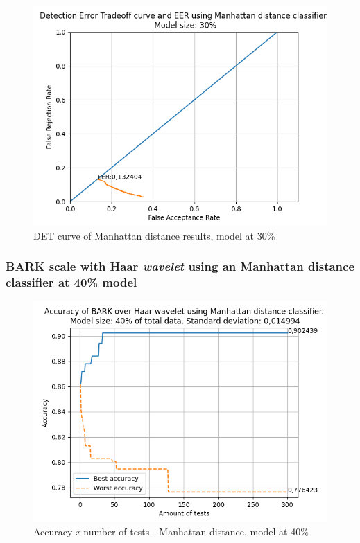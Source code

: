 			\begin{figure}[H]
				\centering
				\includegraphics[scale=.6]{images/results/det/DET_for_classifier_Manhattan_30}
				\caption{DET curve of Manhattan distance results, model at 30\%}
				\label{fig:detforclassifiermanhattan30}
			\end{figure}
		
			
		
		\subsubsection{BARK scale with Haar \textit{wavelet} using an Manhattan distance classifier at 40\% model}
			
			\begin{figure}[H]
				\centering
				\includegraphics[scale=.6]{images/results/confusionMatrices/classifier_Manhattan_40.png}
				\caption{Accuracy \textit{x} number of tests - Manhattan distance, model at 40\%}
				\label{fig:classifiermanhattan40}
			\end{figure}
			
